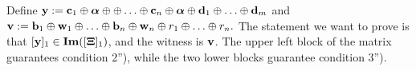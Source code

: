 Define $\mathbf{y}:=\mathbf{c}_1\oplus {\boldsymbol \alpha} \oplus
\oplus \ldots \oplus \mathbf{c}_n\oplus {\boldsymbol \alpha} 
\oplus \mathbf{d}_1 \oplus  \ldots \oplus  \mathbf{d}_m$
and 
 $\mathbf{v}:=\mathbf{b}_1\oplus \mathbf{w}_1 \oplus \ldots \oplus \mathbf{b}_n\oplus \mathbf{w}_n \oplus r_1 \oplus \ldots \oplus r_n.$ The statement we want to prove is that $[\mathbf{y}]_1 \in \mathbf{Im}([\mathbf{{\Xi}}]_1)$, and the witness is $\mathbf{v}$. The upper left block of the matrix guarantees condition 2''), while the two lower blocks guarantee 
condition 3'').  
%  
%
%
% 

